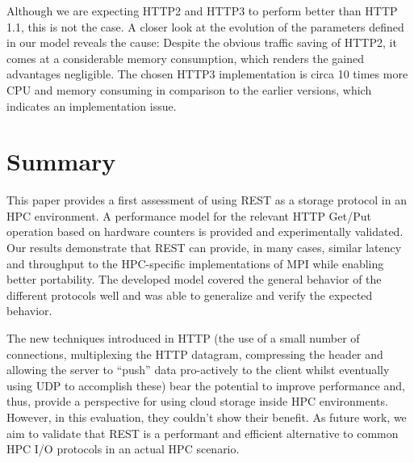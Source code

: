 \documentclass[runningheads]{llncs}
\begin{document}
Although we are expecting HTTP2 and HTTP3 to perform better than HTTP 1.1, this is not the case. A closer look at the evolution of the parameters defined in our model reveals the cause:
Despite the obvious traffic saving of HTTP2, it comes at a considerable memory consumption, which renders the gained advantages negligible. The chosen HTTP3 implementation is circa 10 times more CPU and memory consuming in comparison to the earlier versions, which indicates an implementation issue.

\section{Summary}
This paper provides a first assessment of using REST as a storage protocol in an HPC environment. A performance model for the relevant HTTP Get/Put operation based on hardware counters is provided and experimentally validated.
Our results demonstrate that REST can provide, in many cases, similar latency and throughput to the HPC-specific implementations of MPI while enabling better portability.
The developed model covered the general behavior of the different protocols well and was able to generalize and verify the expected behavior. 

The new techniques introduced in HTTP (the use of a small number of connections, multiplexing the HTTP datagram, compressing the header and allowing the server to “push” data pro-actively to the client whilst eventually using UDP to accomplish these) bear the potential to improve performance and, thus, provide a perspective for using cloud storage inside HPC environments.
However, in this evaluation, they couldn't show their benefit.
As future work, we aim to validate that REST is a performant and efficient alternative to common HPC I/O protocols in an actual HPC scenario.

\nocite{*}
%
%
%





\end{document}
